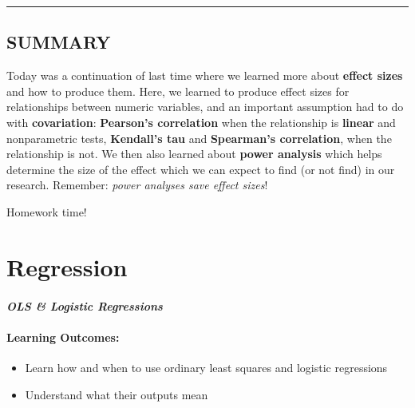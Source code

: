 \documentclass[
]{book}
\providecommand{\tightlist}{%
  \setlength{\itemsep}{0pt}\setlength{\parskip}{0pt}}
\begin{document}
\begin{center}\rule{0.5\linewidth}{0.5pt}\end{center}

\hypertarget{summary-7}{%
\section{SUMMARY}\label{summary-7}}

Today was a continuation of last time where we learned more about \textbf{effect sizes} and how to produce them. Here, we learned to produce effect sizes for relationships between numeric variables, and an important assumption had to do with \textbf{covariation}: \textbf{Pearson's correlation} when the relationship is \textbf{linear} and nonparametric tests, \textbf{Kendall's tau} and \textbf{Spearman's correlation}, when the relationship is not. We then also learned about \textbf{power analysis} which helps determine the size of the effect which we can expect to find (or not find) in our research. Remember: \emph{power analyses save effect sizes}!

Homework time!

\hypertarget{regression}{%
\chapter{Regression}\label{regression}}

\hypertarget{ols-logistic-regressions}{%
\subsubsection*{\texorpdfstring{\emph{OLS \& Logistic Regressions}}{OLS \& Logistic Regressions}}\label{ols-logistic-regressions}}

\hypertarget{learning-outcomes-8}{%
\subsubsection*{Learning Outcomes:}\label{learning-outcomes-8}}

\begin{itemize}
\tightlist
\item
  Learn how and when to use ordinary least squares and logistic regressions
\item
  Understand what their outputs mean
\end{itemize}
\end{document}
